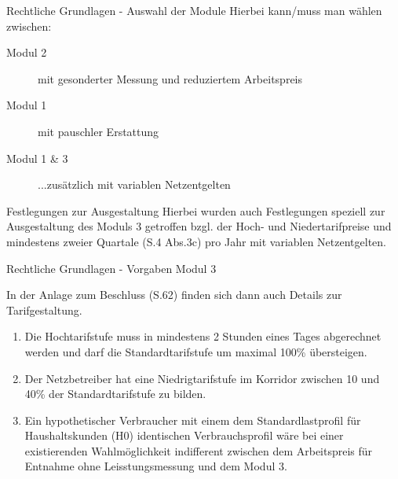 \begin{frame}{Rechtliche Grundlagen - Auswahl der Module}
    Hierbei kann/muss man wählen zwischen:
    \begin{description}
        \item[Modul 2] mit gesonderter Messung und reduziertem Arbeitspreis
        \item[Modul 1] mit pauschler Erstattung
        \item[Modul 1 \& 3] ...zusätzlich mit variablen Netzentgelten
    \end{description} 
    \vspace{0.5cm}
    \begin{block}{Festlegungen zur Ausgestaltung}    
        Hierbei wurden auch Festlegungen speziell zur Ausgestaltung des Moduls 3 getroffen bzgl. der Hoch- und 
        Niedertarifpreise und mindestens zweier Quartale (S.4 Abs.3c) pro Jahr mit variablen Netzentgelten.
    \end{block}
\end{frame}

\begin{frame}{Rechtliche Grundlagen - Vorgaben Modul 3}
   
   In der Anlage zum Beschluss (S.62) finden sich dann auch Details zur Tarifgestaltung.

   \begin{enumerate}
      \item Die Hochtarifstufe muss in mindestens 2 Stunden eines Tages abgerechnet werden 
         und darf die Standardtarifstufe um maximal 100\% übersteigen.
      \item Der Netzbetreiber hat eine Niedrigtarifstufe im Korridor zwischen 10 und 40\% der 
         Standardtarifstufe zu bilden.
      \item Ein hypothetischer Verbraucher mit einem dem Standardlastprofil für 
         Haushaltskunden (H0) identischen Verbrauchsprofil wäre bei einer existierenden 
         Wahlmöglichkeit indifferent zwischen dem Arbeitspreis für Entnahme ohne 
         Leisstungsmessung und dem Modul 3.
   \end{enumerate}
\end{frame}

